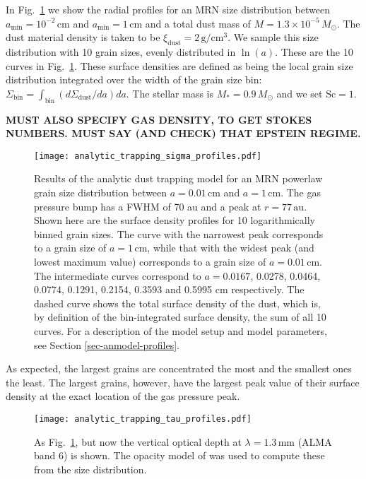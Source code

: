 \documentclass{aa}
\begin{document}
In Fig.~\ref{fig-anmodel-distribution-sigma} we show the radial profiles for an
MRN size distribution between $a_{\mathrm{min}}=10^{-2}\,\mathrm{cm}$ and
$a_{\mathrm{min}}=1\,\mathrm{cm}$ and a total dust mass of $M=1.3\times
10^{-5}\,M_\odot$. The dust material density is taken to be
$\xi_{\mathrm{dust}}=2\,\mathrm{g}/\mathrm{cm}^3$. We sample this size
distribution with 10 grain sizes, evenly distributed in $\ln(a)$. These are the
10 curves in Fig.~\ref{fig-anmodel-distribution-sigma}. These surface densities
are defined as being the local grain size distribution integrated over the width
of the grain size bin:
$\Sigma_{\mathrm{bin}}=\int_{\mathrm{bin}}(d\Sigma_{\mathrm{dust}}/da)da$. The
stellar mass is $M_{*}=0.9\,M_\odot$ and we set $\mathrm{Sc}=1$.

{\bf MUST ALSO SPECIFY GAS DENSITY, TO GET STOKES NUMBERS. MUST SAY
(AND CHECK) THAT EPSTEIN REGIME.}

\begin{figure}
\centerline{\texttt{[image: analytic\_trapping\_sigma\_profiles.pdf]}}
\caption{\label{fig-anmodel-distribution-sigma}Results of the analytic dust
  trapping model for an MRN powerlaw grain size distribution between
  $a=0.01\,\mathrm{cm}$ and $a=1\,\mathrm{cm}$. The gas pressure bump has a FWHM
  of 70 au and a peak at $r=77\,\mathrm{au}$. Shown here are the surface density
  profiles for 10 logarithmically binned grain sizes. The curve with the
  narrowest peak corresponds to a grain size of $a=1\,\mathrm{cm}$, while that
  with the widest peak (and lowest maximum value) corresponds to a grain size of
  $a=0.01\,\mathrm{cm}$. The intermediate curves correspond to $a=0.0167$,
  0.0278, 0.0464, 0.0774, 0.1291, 0.2154, 0.3593 and 0.5995 $\mathrm{cm}$
  respectively. The dashed curve shows the total surface density of the dust,
  which is, by definition of the bin-integrated surface density, the sum of all
  10 curves. For a description of the model setup and model parameters, see
  Section \ref{sec-anmodel-profiles}.}
\end{figure}

As expected, the largest grains are concentrated the most and the smallest ones
the least. The largest grains, however, have the largest peak value of their
surface density at the exact location of the gas pressure peak.

\begin{figure}
\centerline{\texttt{[image: analytic\_trapping\_tau\_profiles.pdf]}}
\caption{\label{fig-anmodel-distribution-tau}As Fig.~\ref{fig-anmodel-distribution-sigma},
  but now the vertical optical depth at $\lambda=1.3\,\mathrm{mm}$ (ALMA band 6)
  is shown. The opacity model of \citet{1997MNRAS.291..121I} was used to compute these
from the size distribution.} 
\end{figure}
\end{document}
